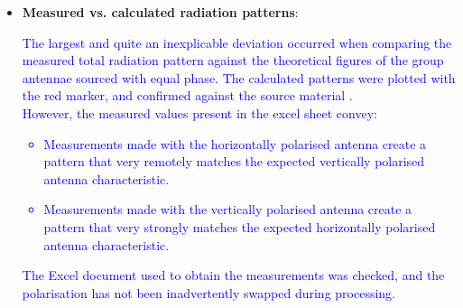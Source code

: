 \begin{itemize}
	\item \textbf{Measured vs. calculated radiation patterns}:\\
	\textcolor{blue}{The largest and quite an inexplicable deviation occurred when comparing the measured total radiation pattern against the theoretical figures of the group antennae sourced with equal phase.
	The calculated patterns were plotted with the red marker, and confirmed against the source material \cite{script}.\\ 
	However, the measured values present in the excel sheet convey:
	\begin{itemize}
		\item Measurements made with the horizontally polarised antenna create a pattern that very remotely matches the expected vertically polarised antenna characteristic.
		\item Measurements made with the vertically polarised antenna create a pattern that very strongly matches the expected horizontally polarised antenna characteristic.
	\end{itemize}
	The Excel document used to obtain the measurements was checked, and the polarisation has not been inadvertently swapped during processing.}
\end{itemize}